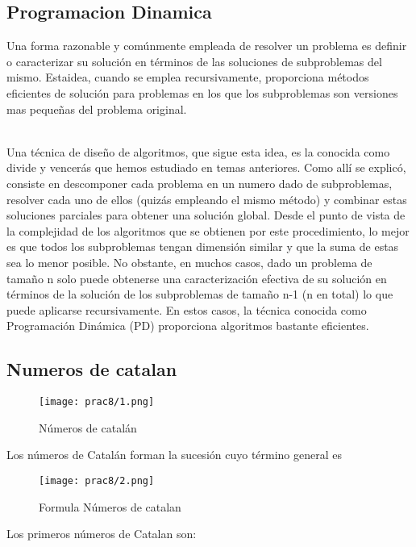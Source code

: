 \documentclass[12pt,twoside]{article}
\begin{document}
\subsection{Programacion Dinamica}
Una forma razonable y comúnmente empleada de resolver un problema es definir o caracterizar su solución en términos de las soluciones de subproblemas del mismo. Estaidea, cuando se emplea recursivamente, proporciona métodos eficientes de solución
para problemas en los que los subproblemas son versiones mas pequeñas del problema original.

\\

Una técnica de diseño de algoritmos, que sigue esta idea, es la conocida como divide
y vencerás que hemos estudiado en temas anteriores. Como allí se explicó, consiste
en descomponer cada problema en un numero dado de subproblemas, resolver cada
uno de ellos (quizás empleando el mismo método) y combinar estas soluciones
parciales para obtener una solución global. Desde el punto de vista de la complejidad de
los algoritmos que se obtienen por este procedimiento, lo mejor es que todos los
subproblemas tengan dimensión similar y que la suma de estas sea lo menor posible. No
obstante, en muchos casos, dado un problema de tamaño n solo puede obtenerse una
caracterización efectiva de su solución en términos de la solución de los
subproblemas de tamaño n-1 (n en total) lo que puede aplicarse recursivamente. En
estos casos, la técnica conocida como Programación Dinámica (PD) proporciona
algoritmos bastante eficientes. 






\subsection{Numeros de catalan}

\begin{figure}[h!]
    \centering
    \texttt{[image: prac8/1.png]} %
    \caption{Números de catalán}
\end{figure}
\noindent
Los números de Catalán forman la sucesión cuyo término general es

\begin{figure}[h!]
    \centering
    \texttt{[image: prac8/2.png]} %
    \caption{Formula Números de catalan}
    
\end{figure}
\endcentering
\noindent
Los primeros números de Catalan son:
\end{document}
